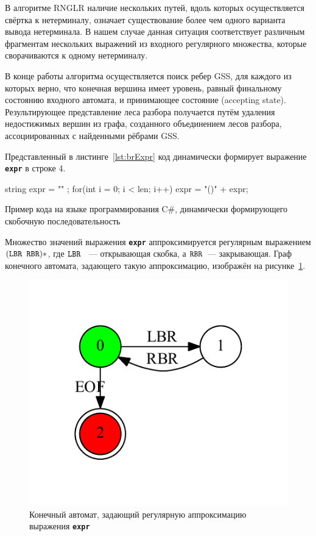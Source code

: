 В алгоритме RNGLR наличие нескольких путей, вдоль которых осуществляется свёртка к нетерминалу, означает существование более чем одного варианта вывода нетерминала. В нашем случае данная ситуация соответствует различным фрагментам нескольких выражений из входного регулярного множества, которые сворачиваются к одному нетерминалу. 

В конце работы алгоритма осуществляется поиск ребер GSS, для каждого из которых верно, что конечная вершина имеет уровень, равный финальному состоянию входного автомата, и принимающее состояние (accepting state). Результирующее представление леса разбора получается путём удаления недостижимых вершин из графа, созданного объединением лесов разбора, ассоциированных с найденными рёбрами GSS.

Представленный в листинге~\ref{lst:brExpr} код динамически формирует выражение \textbf{\texttt{expr}} в строке 4.

\begin{listing}
\begin{pyglist}[language=csharp,numbers=left,numbersep=5pt]
 string expr = "" ;
 for(int i = 0; i < len; i++) 
 {
     expr = "()" + expr;
 }
\end{pyglist}
\caption{Пример кода на языке программирования C\#, динамически формирующего скобочную последовательность}
\label{lst:brExpr}
\end{listing}

Множество значений выражения \textbf{\texttt{expr}} аппроксимируется регулярным выражением $(\mbox{\texttt{LBR }} \mbox{\texttt{RBR}})*$, где $\mbox{\texttt{LBR }}$ --- открывающая скобка, а $\mbox{\texttt{RBR}}$~--- закрывающая. Граф конечного автомата, задающего такую аппроксимацию, изображён на рисунке~\ref{input}.

\begin{figure}[!h]
 \centering
 \includegraphics[]{pics/input.pdf}
 \caption{Конечный автомат, задающий регулярную аппроксимацию выражения \textbf{\texttt{expr}}}
 \label{input}
\end{figure}


